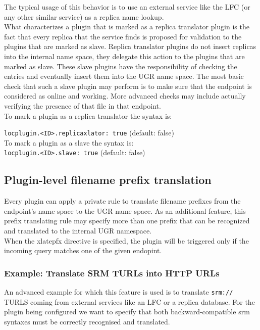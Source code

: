 \documentclass[12pt]{article} %
\begin{document}
The typical usage of this behavior is to use an external service like the LFC (or any other similar service) as a replica name lookup.\\

What characterizes a plugin that is marked as a replica translator plugin is the fact that every replica that the service finds is proposed for validation to the plugins that are marked as slave. Replica translator plugins do not insert replicas into the internal name space, they delegate this action to the plugins that are marked as slave. These slave plugins have the responsibility of checking the entries and eventually insert them into the UGR name space. The most basic check that such a slave plugin may perform is to make sure that the endpoint is considered as online and working. More advanced checks may include actually verifying the presence of that file in that endpoint.\\

To mark a plugin as a replica translator the syntax is:

\lstinline"locplugin.<ID>.replicaxlator: true" (default: false)\\

To mark a plugin as a slave the syntax is:\\

\lstinline"locplugin.<ID>.slave: true" (default: false)\\




\subsection{Plugin-level filename prefix translation}

Every plugin can apply a private rule to translate filename prefixes from the endpoint's name space to the UGR name space. As an additional feature, this prefix translating rule may specify more than one prefix that can be recognized and translated to the internal UGR namespace.\\

When the xlatepfx directive is specified, the plugin will be triggered only if the incoming query matches one of the given endopint.

\subsubsection{Example: Translate SRM TURLs into HTTP URLs}
An advanced example for which this feature is used is to translate \lstinline"srm://" TURLS coming from external services like an LFC or a replica database. For the plugin being configured we want to specify that both backward-compatible srm syntaxes must be correctly recognised and translated.\\
\end{document}
